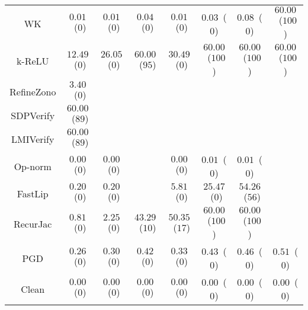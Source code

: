 \begin{table}
{\begin{tabular}{c|c|c|c|c|c|c|c}
           WK &  $0.01$~($0$) &  $0.01$~($0$) &  $0.04$~($0$) &  $0.01$~($0$) &  $0.03$~($0$) &  $0.08$~($0$) & $60.00$~($100$) \\
       k-ReLU & $12.49$~($0$) & $26.05$~($0$) & $60.00$~($95$) & $30.49$~($0$) & $60.00$~($100$) & $60.00$~($100$) & $60.00$~($100$) \\
   RefineZono &  $3.40$~($0$) &               &               &               &               &               &               \\
    SDPVerify & $60.00$~($89$) &               &               &               &               &               &               \\
    LMIVerify & $60.00$~($89$) &               &               &               &               &               &               \\
      Op-norm &  $0.00$~($0$) &  $0.00$~($0$) &               &  $0.00$~($0$) &  $0.01$~($0$) &  $0.01$~($0$) &               \\
      FastLip &  $0.20$~($0$) &  $0.20$~($0$) &               &  $5.81$~($0$) & $25.47$~($0$) & $54.26$~($56$) &               \\
     RecurJac &  $0.81$~($0$) &  $2.25$~($0$) & $43.29$~($10$) & $50.35$~($17$) & $60.00$~($100$) & $60.00$~($100$) &               \\
\hline
          PGD &  $0.26$~($0$) &  $0.30$~($0$) &  $0.42$~($0$) &  $0.33$~($0$) &  $0.43$~($0$) &  $0.46$~($0$) &  $0.51$~($0$) \\
\hline
        Clean &  $0.00$~($0$) &  $0.00$~($0$) &  $0.00$~($0$) &  $0.00$~($0$) &  $0.00$~($0$) &  $0.00$~($0$) &  $0.00$~($0$) \\

    \bottomrule
    \end{tabular}
    }
    \label{table:exp-A-robust-accuracy-time-mnist-0}
\end{table}
        

